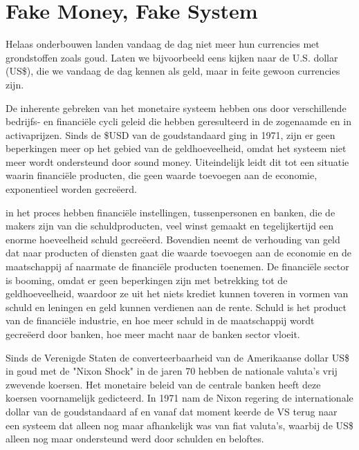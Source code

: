 \section{Fake Money, Fake System}
Helaas onderbouwen landen vandaag de dag niet meer hun currencies  met grondstoffen zoals goud. Laten we bijvoorbeeld eens kijken naar de U.S. dollar (US\$), die we vandaag de dag kennen als geld, maar in feite gewoon currencies zijn.\medskip

De inherente gebreken van het monetaire systeem hebben ons door verschillende bedrijfs- en financi\"ele cycli geleid die hebben geresulteerd in de zogenaamde  en  in activaprijzen. Sinds de \$USD van de goudstandaard ging in 1971, zijn er geen beperkingen meer op het gebied van de geldhoeveelheid, omdat het systeem niet meer wordt ondersteund door sound money. Uiteindelijk leidt dit tot een situatie waarin financiële producten, die geen waarde toevoegen aan de economie, exponentieel worden gecre\"eerd.


in het proces hebben financi\"ele instellingen, tussenpersonen en banken, die de makers zijn van die schuldproducten, veel winst gemaakt en tegelijkertijd een enorme hoeveelheid schuld gecre\"eerd. Bovendien neemt de verhouding van geld dat naar producten of diensten gaat die waarde toevoegen aan de economie en de maatschappij af naarmate de financi\"ele producten toenemen. De financi\"ele sector is booming, omdat er geen beperkingen zijn met betrekking tot de geldhoeveelheid, waardoor ze uit het niets krediet kunnen toveren in vormen van schuld en leningen en geld kunnen verdienen aan de rente. Schuld is het product van de financi\"ele industrie, en hoe meer schuld in de maatschappij wordt gecre\"eerd door banken, hoe meer macht naar de banken sector vloeit.

\medskip


    \begin{tcolorbox}
    [enhanced,
    title=Nixon shock - off the gold standard,
    frame style=
    {left color=orange!85!black,right color=yellow!95!black}]
    
           Sinds de Verenigde Staten de converteerbaarheid van de Amerikaanse dollar US\$ in goud met de "Nixon Shock" in de jaren 70 hebben de nationale valuta's vrij zwevende koersen. Het monetaire beleid van de centrale banken heeft deze koersen voornamelijk gedicteerd. In 1971 nam de Nixon regering de internationale dollar van de goudstandaard af en vanaf dat moment keerde de VS terug naar een systeem dat alleen nog maar afhankelijk was van fiat valuta's, waarbij de US\$ alleen nog maar ondersteund werd door schulden en beloftes. 
      
\end{tcolorbox}
\medskip

